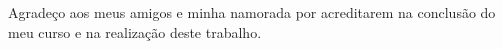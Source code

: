 Agradeço aos meus amigos e minha namorada por acreditarem na conclusão do meu curso e na realização deste trabalho.